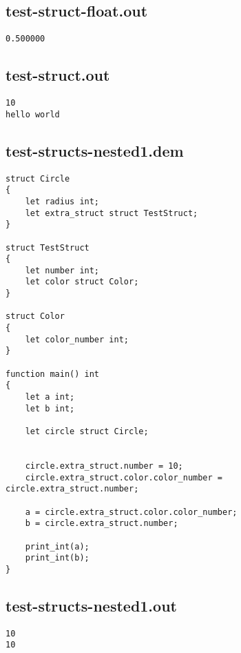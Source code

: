 \subsection{test-struct-float.out}
\begin{lstlisting}
0.500000
\end{lstlisting}
\subsection{test-struct.out}
\begin{lstlisting}
10
hello world
\end{lstlisting}
\subsection{test-structs-nested1.dem}
\begin{lstlisting}
struct Circle
{
	let radius int;
	let extra_struct struct TestStruct;
}

struct TestStruct
{
	let number int;	
	let color struct Color;
}

struct Color
{
	let color_number int;
}	

function main() int
{
	let a int;
	let b int;
	
	let circle struct Circle;
	

	circle.extra_struct.number = 10;
	circle.extra_struct.color.color_number = circle.extra_struct.number;

	a = circle.extra_struct.color.color_number;
	b = circle.extra_struct.number;

	print_int(a);
	print_int(b);
}

\end{lstlisting}
\subsection{test-structs-nested1.out}
\begin{lstlisting}
10
10
\end{lstlisting}
